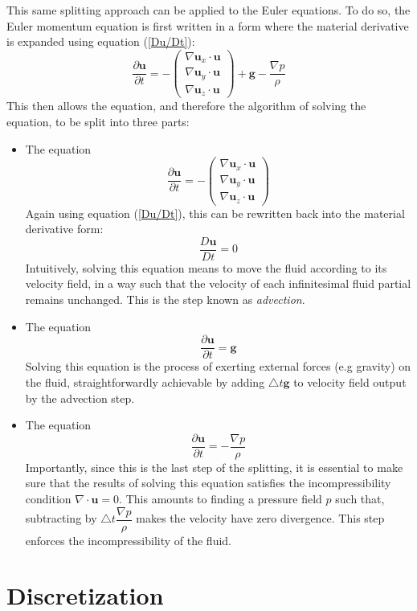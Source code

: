 This same splitting approach can be applied to the Euler equations. To do so, the Euler momentum equation is first written in a form where the material derivative is expanded using equation (\ref{Du/Dt}):
$$
\frac{\partial \textbf{u}}{\partial t}   =  -\begin{pmatrix}
    \nabla \textbf{u}_x  \cdot \textbf{u}\\
     \nabla \textbf{u}_y \cdot \textbf{u}\\
     \nabla \textbf{u}_z \cdot \textbf{u}
  \end{pmatrix}
  + \textbf{g}
  -\frac{\nabla p}{\rho} 
$$
This then allows the equation, and therefore the algorithm of solving the equation, to be split into three parts:
\begin{itemize}
    \item The equation
    $$
    \frac{\partial \textbf{u}}{\partial t}   =  -\begin{pmatrix}
        \nabla \textbf{u}_x  \cdot \textbf{u}\\
         \nabla \textbf{u}_y \cdot \textbf{u}\\
         \nabla \textbf{u}_z \cdot \textbf{u}\end{pmatrix} 
    $$
    Again using equation (\ref{Du/Dt}), this can be rewritten back into the material derivative form:
    $$
    \dfrac{D\textbf{u}}{Dt} = 0
    $$
    Intuitively, solving this equation means to move the fluid according to its velocity field, in a way such that the velocity of each infinitesimal fluid partial remains unchanged. This is the step known as \textit{advection}. 

    \item The equation
    $$
    \frac{\partial \textbf{u}}{\partial t}   = \textbf{g}
    $$
    Solving this equation is the process of exerting external forces (e.g gravity) on the fluid, straightforwardly achievable by adding $\triangle t\textbf{g}$ to velocity field output by the advection step.

    \item The equation
    $$
    \frac{\partial \textbf{u}}{\partial t}   = -\frac{\nabla p}{\rho} 
    $$
    Importantly, since this is the last step of the splitting, it is essential to make sure that the results of solving this equation satisfies the incompressibility condition $\nabla \cdot \textbf{u} = 0$. This amounts to finding a pressure field $p$ such that, subtracting by $\triangle t \dfrac{\nabla p}{\rho}$ makes the velocity have zero divergence. This step enforces the incompressibility of the fluid.

\end{itemize}



\section{Discretization}